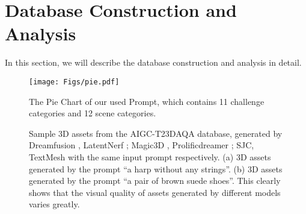 \section{Database Construction and Analysis}
In this section, we will describe the database construction and analysis in detail.
\begin{figure}[b]
    \centering
    \texttt{[image: Figs/pie.pdf]}
    \caption{The Pie Chart of our used Prompt, which contains 11 challenge categories and 12 scene categories.}
    \label{fig:pie}
\end{figure}
\begin{figure*}[t]
    \centering
                
                
    \caption{Sample 3D assets from the AIGC-T23DAQA database, generated by Dreamfusion \cite{poole2022dreamfusion}, LatentNerf \cite{metzer2023latent}; Magic3D \cite{lin2023magic3d}, Prolificdreamer \cite{wang2024prolificdreamer}; SJC\cite{wang2023score}, TextMesh \cite{tsalicoglou2023textmesh} with the same input prompt respectively. (a) 3D assets generated by the prompt ``a harp without any strings''. (b) 3D assets generated by the prompt ``a pair of brown suede shoes''. This clearly shows that the visual quality of assets generated by different models varies greatly.}
    \label{fig:gallery}
    \vspace{-0.5cm}
\end{figure*}
\vspace{-15pt}
